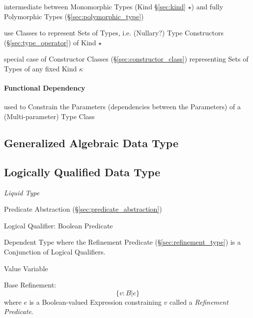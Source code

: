 \cite{jones95}

intermediate between Monomorphic Types (Kind \S\ref{sec:kind} $\star$)
and fully Polymorphic Types (\S\ref{sec:polymorphic_type})

use Classes to represent Sets of Types, i.e. (Nullary?) Type
Constructors (\S\ref{sec:type_operator}) of Kind $\star$

special case of Constructor Classes (\S\ref{sec:constructor_class})
representing Sets of Types of any fixed Kind $\kappa$



\paragraph{Functional Dependency}\label{sec:functional_dependency}\hfill

used to Constrain the Parameters (dependencies between the Parameters)
of a (Multi-parameter) Type Class




\subsection{Generalized Algebraic Data Type}\label{sec:gadt}

\subsection{Logically Qualified Data Type}
\label{sec:logically_qualified}

\cite{rondon-kawaguchi-jhala08}

\emph{Liquid Type}

Predicate Abstraction (\S\ref{sec:predicate_abstraction})

Logical Qualifier: Boolean Predicate

Dependent Type where the Refinement Predicate
(\S\ref{sec:refinement_type}) is a Conjunction of Logical Qualifiers.

Value Variable

Base Refinement:
\[
  \{ v : B | e \}
\]
where $e$ is a Boolean-valued Expression constraining $v$ called a
\emph{Refinement Predicate}.



